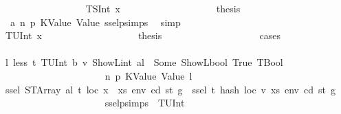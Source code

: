 \begin{isabellebody}
\ \ \ \ \ \ \ \ \ \ \ \ \ \ \ \ \isamarkupfalse%
\ {\isacharparenleft}{\kern0pt}TSInt\ x{}{\isacharparenright}{\kern0pt}\isanewline
\ \ \ \ \ \ \ \ \ \ \ \ \ \ \ \ \isamarkupfalse%
\ \isamarkupfalse%
\ {\isacharquery}{\kern0pt}thesis\ \isamarkupfalse%
\ {}\ a{}\ n\ p{}\ KValue\ Value\ ssel{\isachardot}{\kern0pt}psimps{\isacharparenleft}{\kern0pt}{}{\isacharparenright}{\kern0pt}\ \isamarkupfalse%
\ simp\isanewline
\ \ \ \ \ \ \ \ \ \ \ \ \ \ \isamarkupfalse%
\isanewline
\ \ \ \ \ \ \ \ \ \ \ \ \ \ \ \ \isamarkupfalse%
\ {\isacharparenleft}{\kern0pt}TUInt\ x{}{\isacharparenright}{\kern0pt}\isanewline
\ \ \ \ \ \ \ \ \ \ \ \ \ \ \ \ \isamarkupfalse%
\ \isamarkupfalse%
\ {\isacharquery}{\kern0pt}thesis\isanewline
\ \ \ \ \ \ \ \ \ \ \ \ \ \ \ \ \ \ \isamarkupfalse%
\ {\isacharparenleft}{\kern0pt}cases{\isacharparenright}{\kern0pt}\isanewline
\ \ \ \ \ \ \ \ \ \ \ \ \ \ \ \ \ \ \ \ \isamarkupfalse%
\ l{\isacharcolon}{\kern0pt}\ {\isachardoublequoteopen}less\ t{\isacharprime}{\kern0pt}\ {\isacharparenleft}{\kern0pt}TUInt\ b{}{}{}{\isacharparenright}{\kern0pt}\ v\ {\isacharparenleft}{\kern0pt}ShowL\isactrlsub i\isactrlsub n\isactrlsub t\ al{\isacharparenright}{\kern0pt}\ {\isacharequal}{\kern0pt}\ Some\ {\isacharparenleft}{\kern0pt}ShowL\isactrlsub b\isactrlsub o\isactrlsub o\isactrlsub l\ True{\isacharcomma}{\kern0pt}\ TBool{\isacharparenright}{\kern0pt}{\isachardoublequoteclose}\isanewline
\ \ \ \ \ \ \ \ \ \ \ \ \ \ \ \ \ \ \ \ \isamarkupfalse%
\ n\ p{}\ KValue\ Value\ l\isanewline
\ \ \ \ \ \ \ \ \ \ \ \ \ \ \ \ \ \ \ \ \isamarkupfalse%
\ {\isachardoublequoteopen}ssel\ {\isacharparenleft}{\kern0pt}STArray\ al\ t{\isacharparenright}{\kern0pt}\ loc\ {\isacharparenleft}{\kern0pt}x\ {\isacharhash}{\kern0pt}\ xs{\isacharparenright}{\kern0pt}\ env\ cd\ st\ g\ {\isacharequal}{\kern0pt}\ ssel\ t\ {\isacharparenleft}{\kern0pt}hash\ loc\ v{\isacharparenright}{\kern0pt}\ xs\ env\ cd\ st\ g{\isacharprime}{\kern0pt}{\isacharprime}{\kern0pt}{\isachardoublequoteclose}\isanewline
\ \ \ \ \ \ \ \ \ \ \ \ \ \ \ \ \ \ \ \ \isamarkupfalse%
\ ssel{\isachardot}{\kern0pt}psimps{\isacharparenleft}{\kern0pt}{}{\isacharparenright}{\kern0pt}\ {}{\isacharparenleft}{\kern0pt}{}{\isacharparenright}{\kern0pt}\ TUInt\ \isamarkupfalse%

\end{isabellebody}
